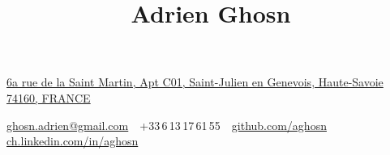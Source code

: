 \documentclass[a4paper,10pt,oneside]{article}
\begin{document}
\clearpage
\thispagestyle{empty}

\title{Adrien Ghosn}

\begin{subtitle}
\href{https://www.google.com/maps/place/6+Rue+de+la+Saint-Martin,+74160+Saint-Julien-en-Genevois,+France/@46.1462523,6.0852366,17z/data=!3m1!4b1!4m2!3m1!1s0x478c7b8a6860d24b:0xb4b59d1320abf78e}
{6a rue de la Saint Martin, Apt C01, Saint-Julien en Genevois, Haute-Savoie 74160, FRANCE}
\par
\href{mailto:ghosn.adrien@gmail.com}
{ghosn.adrien@gmail.com}
\,\BulletSymbol\,
+33\,6\,13\,17\,61\,55
\,\BulletSymbol\,
\href{https://github.com/aghosn}
{github.com/aghosn}
\,\BulletSymbol\,
\href{http://ch.linkedin.com/in/aghosn}
{ch.linkedin.com/in/aghosn}
\end{subtitle}
\end{document}
